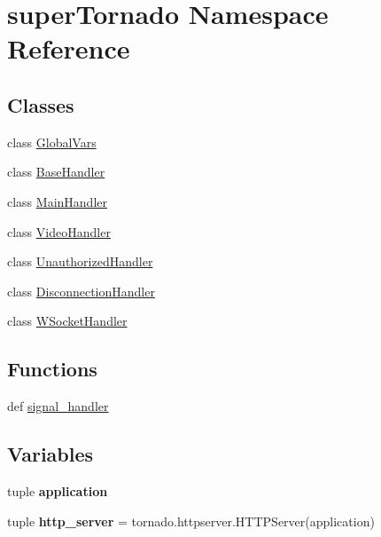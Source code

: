 \hypertarget{namespacesuper_tornado}{\section{super\-Tornado Namespace Reference}
\label{namespacesuper_tornado}
}
\subsection*{Classes}
\begin{DoxyCompactItemize}
\item 
class \hyperlink{classsuper_tornado_1_1_global_vars}{Global\-Vars}
\item 
class \hyperlink{classsuper_tornado_1_1_base_handler}{Base\-Handler}
\item 
class \hyperlink{classsuper_tornado_1_1_main_handler}{Main\-Handler}
\item 
class \hyperlink{classsuper_tornado_1_1_video_handler}{Video\-Handler}
\item 
class \hyperlink{classsuper_tornado_1_1_unauthorized_handler}{Unauthorized\-Handler}
\item 
class \hyperlink{classsuper_tornado_1_1_disconnection_handler}{Disconnection\-Handler}
\item 
class \hyperlink{classsuper_tornado_1_1_w_socket_handler}{W\-Socket\-Handler}
\end{DoxyCompactItemize}
\subsection*{Functions}
\begin{DoxyCompactItemize}
\item 
def \hyperlink{namespacesuper_tornado_a2f3428d5d40a763759588adcf3c1552a}{signal\-\_\-handler}
\end{DoxyCompactItemize}
\subsection*{Variables}
\begin{DoxyCompactItemize}
\item 
tuple {\bfseries application}
\item 
\hypertarget{namespacesuper_tornado_acc65a75d3941165f9c5e66f6af6bd32f}{tuple {\bfseries http\-\_\-server} = tornado.\-httpserver.\-H\-T\-T\-P\-Server(application)}\label{namespacesuper_tornado_acc65a75d3941165f9c5e66f6af6bd32f}

\end{DoxyCompactItemize}


